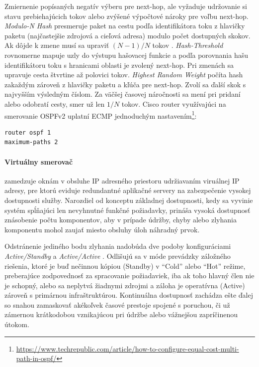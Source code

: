 \documentclass[12pt, a4paper]{article}
\begin{document}
Zmiernenie popísaných negatív výberu pre next-hop, ale vyžaduje udržovanie si 
stavu prebiehajúcich tokov alebo zvýšené výpočtové nároky pre voľbu next-hop. \emph{Modulo-N Hash} 
presmeruje paket na cestu podľa identifikátora toku z hlavičky paketu (najčastejšie zdrojová a cieľová 
adresa) modulo počet dostupných skokov. Ak dôjde k zmene musí sa upraviť $(N-1)/N$ tokov
 \cite{RFC2991}. \emph{Hash-Threshold} rovnomerne mapuje uzly do výstupu hašovacej funkcie a podľa 
porovnania hašu identifikátoru toku s hranicami oblasti je zvolený next-hop. Pri zmenách sa upravuje cesta 
štvrtine až polovici tokov. \emph{Highest Random Weight} počíta hash zakaždým zároveň z hlavičky paketu a
kľúča pre next-hop. Zvolí sa ďalší skok s najvyšším výsledným číslom. Za väčšej časovej náročnosti
sa mení pri pridaní alebo odobratí cesty, smer už len $1/N$ tokov. Cisco router využívajúci na smerovanie
OSPFv2 uplatní ECMP jednoduchým nastavením\footnote{\url{https://www.techrepublic.com/article/how-to-configure-equal-cost-multi-path-in-ospf/}}:
\begin{lstlisting}
router ospf 1
maximum-paths 2
\end{lstlisting}

\paragraph{Virtuálny smerovač} zamedzuje oknám v obsluhe IP adresného priestoru udržiavaním viruálnej 
IP adresy, pre ktorú eviduje redundantné aplikačné servery na zabezpečenie vysokej dostupnosti služby. 
Narozdiel od konceptu základnej dostupnosti, kedy sa vyvinie systém spĺňajúci len nevyhnutné funkčné 
požiadavky, prináša vysoká dostupnosť znásobenie počtu komponentov, aby v prípade údržby, chyby alebo 
zlyhania komponentu mohol zaujať miesto obsluhy úloh náhradný prvok. 

Odstránenie jediného bodu zlyhania nadobúda dve podoby konfiguráciami \emph{Active/Standby} a
\emph{Active/Active} \cite{availability}. Odlišujú sa v móde prevádzky záložného riešenia, 
ktoré je buď nečinnou kópiou (Standby) v \enquote{Cold} alebo \enquote{Hot} režime, preberajúce 
zodpovednosť za spracovanie požiadaviek, iba ak toho hlavný člen nie je schopný, alebo 
sa neplytvá žiadnymi zdrojmi a záloha je operatívna (Active) zároveň s primárnou infraštruktúrou. 
Kontinuálna dostupnosť zachádza ešte ďalej so snahou zamaskovať akékoľvek časové prestoje spojené s 
poruchou, či už zámernou krátkodobou vznikajúcou pri údržbe alebo vážnejšou zapríčinenou útokom.
\end{document}
